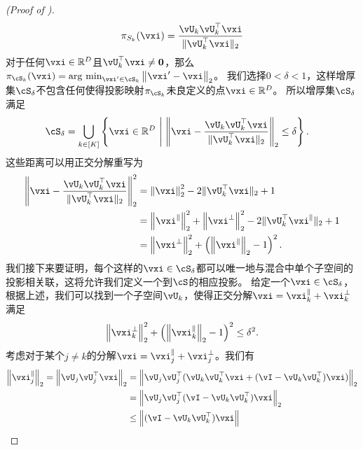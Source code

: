 \documentclass[../../book-main.tex]{subfiles}
\begin{document}
\begin{proof}[(Proof of )]
    \begin{equation}
        \pi_{S_k}(\vxi) = \frac{\vU_k\vU_k^\top \vxi}{\norm{\vU_k^\top \vxi}_2}
    \end{equation}
    对于任何$\vxi \in \R^D$且$\vU_k^\top \vxi \neq \mathbf{0}$，那么$\pi_{\cS_k}(\vxi) = \argmin_{\vxi' \in \cS_k}\norm*{\vxi' - \vxi}_2$。
    我们选择$0 < \delta < 1$，这样增厚集$\cS_{\delta}$不包含任何使得投影映射$\pi_{\cS_k}$未良定义的点$\vxi \in \R^D$。
    所以增厚集$\cS_{\delta}$满足
    \begin{align}
        \cS_{\delta} 
        &= \bigcup_{k \in [K]} \set*{\vxi \in \R^D \given 
        \norm*{\vxi - \frac{\vU_k\vU_k^\top \vxi}{\norm{\vU_k^\top \vxi}_2}}_2
        \leq \delta}.
    \end{align}
    这些距离可以用正交分解重写为
    \begin{align}
        \norm*{\vxi - \frac{\vU_k\vU_k^\top \vxi}{\norm{\vU_k^\top \vxi}_2}}_2^2
        &=
        \norm*{\vxi}_2^2 - 2 \norm{\vU_k^\top \vxi}_2 + 1
        \\
        &=
        \norm*{\vxi^{\|}}_2^2 
        + \norm*{\vxi^{\perp}}_2^2
        - 2 \norm{\vU_k^\top \vxi^{\|}}_2 + 1
        \\
        &=
        \norm*{\vxi^{\perp}}_2^2
        + \left( \norm*{\vxi^{\|}}_2 - 1 \right)^2.
        \label{eq:distance-to-hypersphere}
    \end{align}
    我们接下来要证明，每个这样的$\vxi \in \cS_{\delta}$都可以唯一地与混合中单个子空间的投影相关联，这将允许我们定义一个到$\cS$的相应投影。
    给定一个$\vxi \in \cS_{\delta}$，根据上述，我们可以找到一个子空间$\vU_k$，使得正交分解$\vxi = \vxi^{\|}_k + \vxi^{\perp}_k$满足
    \begin{equation}
        \norm*{\vxi^{\perp}_k}_2^2
        + \left( \norm*{\vxi^{\|}_k}_2 - 1 \right)^2
        \leq
        \delta^2.
    \end{equation}
    考虑对于某个$j \neq k$的分解$\vxi = \vxi_j^{\|} + \vxi_j^{\perp}$。我们有
    \begin{align}
        \norm*{\vxi_j^{\|}}_2
        =
        \norm*{
            \vU_j \vU_j^\top \vxi 
        }_2
        &=
        \norm*{
            \vU_j \vU_j^\top( \vU_k \vU_k^\top \vxi + (\vI - \vU_k \vU_k^\top)
            \vxi )
        }_2
        \\
        &=
        \norm*{
            \vU_j \vU_j^\top (\vI - \vU_k \vU_k^\top) \vxi
        }_2
        \\
        &\leq
        \norm*{
            (\vI - \vU_k \vU_k^\top) \vxi
}
\end{align}
\end{proof}
\end{document}
